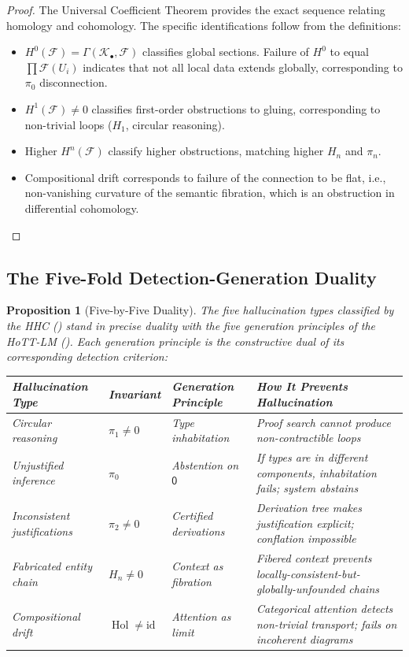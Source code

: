 \documentclass[11pt,a4paper]{article}
\theoremstyle{plain}
\newtheorem{proposition}[theorem]{Proposition}
\theoremstyle{definition}
\theoremstyle{remark}
\newcommand{\id}{\mathrm{id}}
\DeclareMathOperator{\Hol}{Hol}
\begin{document}
\begin{proof}
The Universal Coefficient Theorem provides the exact sequence relating homology and cohomology. The specific identifications follow from the definitions:
\begin{itemize}[nosep]
  \item $H^0(\mathcal{F}) = \Gamma(\mathcal{K}_\bullet, \mathcal{F})$ classifies global sections. Failure of $H^0$ to equal $\prod \mathcal{F}(U_i)$ indicates that not all local data extends globally, corresponding to $\pi_0$ disconnection.
  \item $H^1(\mathcal{F}) \neq 0$ classifies first-order obstructions to gluing, corresponding to non-trivial loops ($H_1$, circular reasoning).
  \item Higher $H^n(\mathcal{F})$ classify higher obstructions, matching higher $H_n$ and $\pi_n$.
  \item Compositional drift corresponds to failure of the connection to be flat, i.e., non-vanishing curvature of the semantic fibration, which is an obstruction in differential cohomology.
\end{itemize}
\end{proof}

\subsection{The Five-Fold Detection-Generation Duality}

\begin{proposition}[Five-by-Five Duality]\label{prop:five-by-five}
The five hallucination types classified by the HHC () stand in precise duality with the five generation principles of the HoTT-LM (). Each generation principle is the constructive dual of its corresponding detection criterion:
\begin{center}
\begin{tabular}{p{3cm}lp{3.2cm}p{4.5cm}}
\toprule
\textbf{Hallucination Type} & \textbf{Invariant} & \textbf{Generation Principle} & \textbf{How It Prevents Hallucination} \\
\midrule
Circular reasoning & $\pi_1 \neq 0$ & Type inhabitation & Proof search cannot produce non-contractible loops \\
Unjustified inference & $\pi_0$ & Abstention on $\mathsf{0}$ & If types are in different components, inhabitation fails; system abstains \\
Inconsistent justifications & $\pi_2 \neq 0$ & Certified derivations & Derivation tree makes justification explicit; conflation impossible \\
Fabricated entity chain & $H_n \neq 0$ & Context as fibration & Fibered context prevents locally-consistent-but-globally-unfounded chains \\
Compositional drift & $\Hol \neq \id$ & Attention as limit & Categorical attention detects non-trivial transport; fails on incoherent diagrams \\
\bottomrule
\end{tabular}
\end{center}
\end{proposition}
\end{document}
